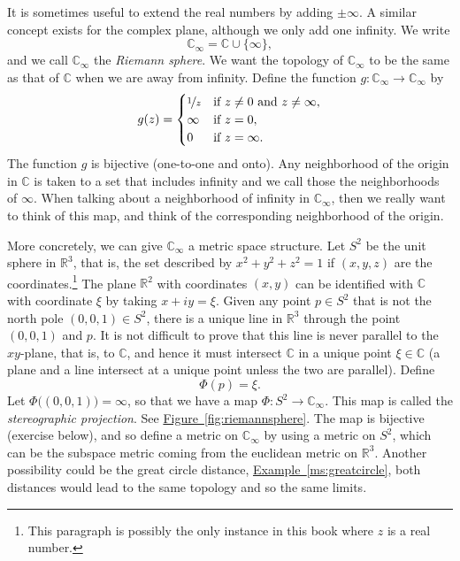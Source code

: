 \documentclass[12pt,openany]{book}
\newcommand{\C}{{\mathbb{C}}}
\newcommand{\R}{{\mathbb{R}}}
\newcommand{\myindex}[1]{#1\index{#1}}
\theoremstyle{plain}
\theoremstyle{remark}
\theoremstyle{definition}
\theoremstyle{exercise}
\theoremstyle{example}
\newcommand{\figureref}[1]{\hyperref[#1]{Figure~\ref*{#1}}}
\newcommand{\exampleref}[1]{\hyperref[#1]{Example~\ref*{#1}}}
\begin{document}
It is sometimes useful to extend the real numbers by adding $\pm \infty$.
A similar concept exists for the complex plane, although
we only add one infinity.  We write
%
%
\begin{equation*}
\C_{\infty} = \C \cup \{ \infty \} ,
\end{equation*}
and we call $\C_{\infty}$ the \emph{\myindex{Riemann sphere}}.
We want the topology of $\C_\infty$ to be the same as that of $\C$
when we are away from infinity.
Define the function $g \colon \C_\infty \to \C_\infty$ by
\begin{equation*}
g(z) =
\begin{cases}
\nicefrac{1}{z} & \text{if } z \not= 0 \text{ and } z \not= \infty, \\
\infty & \text{if } z = 0, \\
0 & \text{if } z = \infty.
\end{cases}
\end{equation*}
The function $g$ is bijective (one-to-one and onto).
Any neighborhood of the origin in $\C$ is taken to a set that
includes infinity and we call those the neighborhoods of
$\infty$.  When talking about a neighborhood of
infinity in $\C_{\infty}$, then we really want to think of this map,
and think of the corresponding neighborhood of the origin.

More concretely, we can give $\C_{\infty}$ a metric space structure.
Let $S^2$ be the unit sphere in $\R^3$,
that is, the set described by $x^2 + y^2 + z^2 = 1$ if $(x,y,z)$ are the
coordinates.\footnote{This paragraph is possibly the only instance in this book where
$z$ is a real number.}  The plane $\R^2$ with coordinates $(x,y)$ can be
identified with $\C$ with coordinate $\xi$ by taking $x+iy = \xi$.
Given any point $p \in S^2$ that is not the north pole $(0,0,1) \in S^2$,
there is a unique line in $\R^3$ through the point $(0,0,1)$ and $p$.
It is not difficult to prove that this line is never parallel to the
$xy$-plane, that is, to $\C$, and hence it must intersect $\C$ in a unique
point $\xi \in \C$ (a plane and a line intersect at a unique point unless
the two are parallel).  Define
\begin{equation*}
\Phi(p) = \xi.
\end{equation*}
Let $\Phi\bigl((0,0,1)\bigr) = \infty$, so that we have a map
$\Phi \colon S^2 \to \C_\infty$.  This map is called the 
\emph{\myindex{stereographic projection}}.  See
\figureref{fig:riemannsphere}.
The map is bijective (exercise below),
and so define a metric on $\C_\infty$ by
using a metric on $S^2$, which can be the subspace
metric coming from the euclidean metric on $\R^3$.
Another possibility
could be the great circle distance, \exampleref{ms:greatcircle}, both
distances would lead to the same topology and so the same limits.
\end{document}
